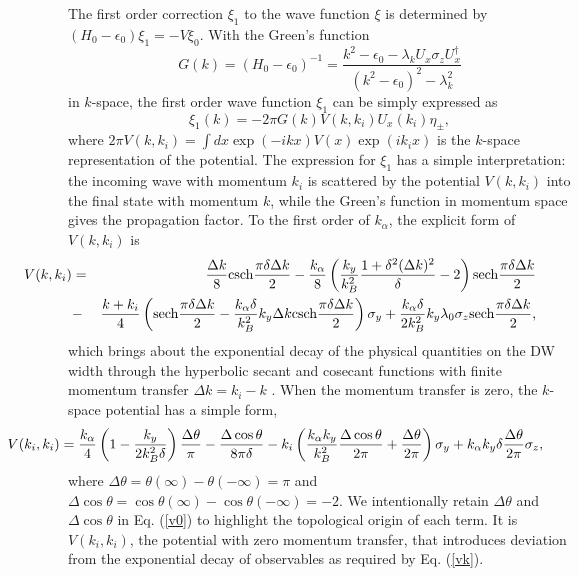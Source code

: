 \documentclass[12pt]{iopart}
\begin{document}
The first order correction $\xi_1$ to the wave function $\xi$ is determined by $(H_0 - \epsilon_0) \xi_1 = - V \xi_0$. With the Green's function
\begin{equation}
G(k) = (H_0 - \epsilon_0)^ {-1} = \frac {k^2 - \epsilon_0 - \lambda_k U_x \sigma_z U_x ^ \dagger} {(k^2 - \epsilon_0)^2 - \lambda_k^2}
\end{equation}
in $k$-space, the first order wave function $\xi_1$ can be simply expressed as
\begin{equation}
\xi_1 (k) = - 2 \pi G(k) V(k, k_i) U_x (k_i) \eta_ \pm,
\end{equation}
where $2 \pi V(k, k_i) = \int dx \exp {(-i k x)} V(x) \exp {(i k_i x)}$ is the $k$-space representation of the potential. The expression for $\xi_1$ has a simple interpretation: the incoming wave with momentum $k_i$ is scattered by the potential $V(k, k_i)$ into the final state with momentum $k$, while the Green's function in momentum space gives the propagation factor. To the first order of $k_ \alpha$, the explicit form of $V(k, k_i)$ is
\begin{eqnarray}
\hspace {-2 cm} V(k, k_i) &=& \frac {\Delta k} {8} \mbox {csch} \frac {\pi \delta \Delta k} {2} - \frac {k_ \alpha} {8} \left( \frac {k_y} {k_B^2} \frac {1 + \delta^2 (\Delta k)^2} {\delta} - 2 \right) \mbox {sech} \frac {\pi \delta \Delta k} {2} \nonumber\\
\hspace {-2 cm} &-& \frac {k + k_i} {4} \left( \mbox {sech} \frac {\pi \delta \Delta k} {2} - \frac {k_ \alpha \delta} {k_B^2} k_y \Delta k \mbox {csch} \frac {\pi \delta \Delta k} {2} \right) \sigma_y + \frac {k_ \alpha \delta} {2 k_B^2} k_y \lambda_0 \sigma_z \mbox {sech} \frac {\pi \delta \Delta k} {2},
\label{vk}
\end{eqnarray}
which brings about the exponential decay of the physical quantities on the DW width through the hyperbolic secant and cosecant functions with finite momentum transfer $\Delta k = k_i - k$ \cite{Dugaev02}. When the momentum transfer is zero, the $k$-space potential has a simple form,
\begin{equation}
\hspace {-2.2 cm} V(k_i, k_i) = \frac {k_ \alpha} {4} \left( 1 - \frac {k_y} {2 k_B^2 \delta} \right) \frac {\Delta \theta} {\pi} - \frac {\Delta \cos \theta} {8 \pi \delta} - k_i \left( \frac {k_ \alpha k_y} {k_B^2} \frac {\Delta \cos \theta} {2 \pi} + \frac {\Delta \theta} {2 \pi} \right) \sigma_y + k_ \alpha k_y \delta \frac {\Delta \theta} {2 \pi} \sigma_z,
\label{v0}
\end{equation}
where $\Delta \theta = \theta(\infty) - \theta (-\infty) = \pi$ and $\Delta \cos \theta = \cos \theta(\infty) - \cos \theta (-\infty) = - 2$. We intentionally retain $\Delta \theta$ and $\Delta \cos \theta$ in Eq. (\ref{v0}) to highlight the topological origin of each term. It is $V(k_i, k_i)$, the potential with zero momentum transfer, that introduces deviation from the exponential decay of observables as required by Eq. (\ref{vk}).
\end{document}
